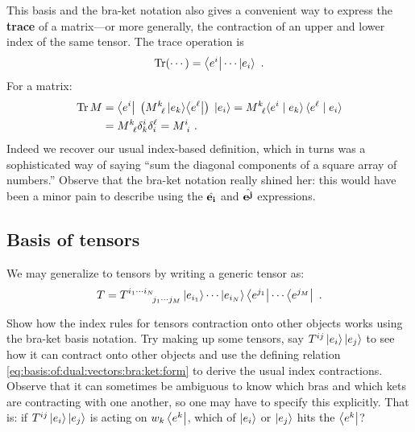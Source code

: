 \documentclass[12pt, oneside]{report}    %
\begin{document}
This basis and the bra-ket notation also gives a convenient way to express the \textbf{trace} of a matrix---or more generally, the contraction of an upper and lower index of the same tensor. The trace operation is
\begin{align}
    \operatorname{\textnormal{Tr}}(\cdots) = 
    \left\langle e^i\right| \cdots \left|e_i\right\rangle \ .
\end{align}
For a matrix:
\begin{align}
    \Tr M &= \bra{e^i}\; \left(M\aij{k}{\ell}\ket{e_k}\!\bra{e^\ell}\right) \;\ket{e_i}
    = M\aij{k}{\ell}  
    \la {e^i} \mid {e_k}\ra \, \la {e^\ell} \mid {e_i} \ra 
    \\
    &= 
    M\aij{k}{\ell}  \delta^i_k \delta^\ell_i 
    =  M\aij{i}{i} \ .
\end{align}
Indeed we recover our usual index-based definition, which in turns was a sophisticated way of saying ``sum the diagonal components of a square array of numbers.'' Observe that the bra-ket notation really shined her: this would have been a minor pain to describe using the $\hat{\mathbf{e_i}}$ and $\hat{\mathbf{e^j}}$ expressions.





 \subsection{Basis of tensors}

 We may generalize to tensors by writing a generic tensor as:
 \begin{align}
    T =
     T\aij{i_1\cdots i_N}{j_1\cdots j_M}
     \ket{e_{i_1}}\cdots \ket{e_{i_N}}
     \bra{e^{j_1}}\cdots \bra{e^{j_M}} \ .
 \end{align}
\begin{exercise}
Show how the index rules for tensors contraction onto other objects works using the bra-ket basis notation. Try making up some tensors, say $T^{ij} \left|e_i\right\rangle\left|e_j\right\rangle$ to see how it can contract onto other objects and use the defining relation \eqref{eq:basis:of:dual:vectors:bra:ket:form} to derive the usual index contractions. Observe that it can sometimes be ambiguous to know which bras and which kets are contracting with one another, so one may have to specify this explicitly. That is: if $T^{ij} \left|e_i\right\rangle\left|e_j\right\rangle$ is acting on $w_k\left\langle e^k\right|$, which of $\left|e_i\right\rangle$ or $\left|e_j\right\rangle$ hits the $\left\langle e^k\right|$? 
\end{exercise}
\end{document}
